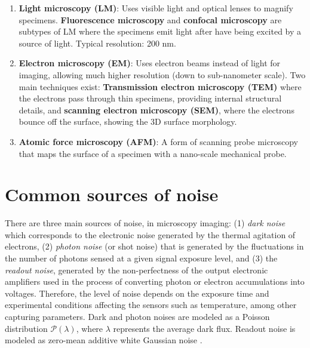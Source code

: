 \documentclass{article}
\begin{document}
\begin{enumerate}
\item \textbf{Light microscopy (LM)}: Uses visible light and optical
  lenses to magnify specimens. \textbf{Fluorescence microscopy} and
  \textbf{confocal microscopy} are subtypes of LM where the specimens emit
  light after have being excited by a source of light. Typical
  resolution: 200 nm.
\item \textbf {Electron microscopy (EM)}: Uses electron beams instead
  of light for imaging, allowing much higher resolution (down to
  sub-nanometer scale). Two main techniques exist:
  \textbf{Transmission electron microscopy (TEM)} where the electrons
  pass through thin specimens, providing internal structural details,
  and \textbf{scanning electron microscopy (SEM)}, where the electrons
  bounce off the surface, showing the 3D surface morphology.
\item \textbf{Atomic force microscopy (AFM)}: A form of scanning probe
  microscopy that maps the surface of a specimen with a nano-scale
  mechanical probe.
\end{enumerate}


\section{Common sources of noise}

There are three main sources of noise, in microscopy imaging: (1)
\emph{dark noise} which corresponds to the electronic noise generated
by the thermal agitation of electrons, (2) \emph{photon noise} (or
shot noise) that is generated by the fluctuations in the number of
photons sensed at a given signal exposure level, and (3) the
\emph{readout noise}, generated by the non-perfectness of the output
electronic amplifiers used in the process of converting photon or
electron accumulations into voltages. Therefore, the level of noise
depends on the exposure time and experimental conditions affecting the
sensors such as temperature, among other capturing parameters. Dark
and photon noises are modeled as a Poisson distribution
$\mathcal{P}(\lambda)$, where $\lambda$ represents the average dark
flux. Readout noise is modeled as zero-mean additive white Gaussian
noise \cite{meiniel2018denoising,zhou2020wirtinger}.
\end{document}
